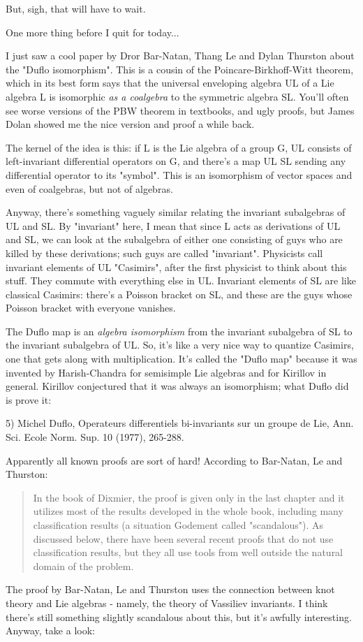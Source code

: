 But, sigh, that will have to wait.

One more thing before I quit for today...

I just saw a cool paper by Dror Bar-Natan, Thang Le and Dylan Thurston
about the "Duflo isomorphism".  This is a cousin of the 
Poincare-Birkhoff-Witt 
theorem, which in its best form says that the universal enveloping 
algebra UL of a Lie algebra L is isomorphic \emph{as a coalgebra} to the 
symmetric algebra SL.  You'll often see worse versions of the PBW theorem 
in textbooks, and ugly proofs, but James Dolan showed me the nice version 
and proof a while back.

The kernel of the idea is this: if L is the Lie algebra of a group G, 
UL consists of left-invariant differential operators on G, and there's 
a map UL \to  SL sending any differential operator to its "symbol".  
This is an isomorphism of vector spaces and even of coalgebras, but
not of algebras.  

Anyway, there's something vaguely similar relating the invariant 
subalgebras of UL and SL.  By "invariant" here, I mean that since 
L acts as derivations of UL and SL, we can look at the subalgebra of
either one consisting of guys who are killed by these derivations; 
such guys are called "invariant".   Physicists call invariant 
elements of UL "Casimirs", after the first physicist to think 
about this stuff.  They commute with everything else in 
UL.  Invariant elements of 
SL are like classical Casimirs: there's a Poisson bracket on SL, and
these are the guys whose Poisson bracket with everyone vanishes.

The Duflo map is an \emph{algebra isomorphism} from the invariant
subalgebra of SL to the invariant subalgebra of 
UL.  So, it's
like a very nice way to quantize Casimirs, one that gets along with
multiplication.  It's called the "Duflo map" because it was 
invented by
Harish-Chandra for semisimple Lie algebras and for Kirillov in general.
Kirillov conjectured that it was always an isomorphism; what Duflo
did is prove it: 

5) Michel Duflo, Operateurs differentiels bi-invariants sur un groupe
de Lie, Ann. Sci. Ecole Norm. Sup. 10 (1977), 265-288.

Apparently all known proofs are sort of hard!  According to Bar-Natan,
Le and Thurston:

\begin{quote}
   In the book of Dixmier, the proof is given only in the last chapter
   and it utilizes most of the results developed in the whole book, 
   including many classification results (a situation Godement called
   "scandalous").  As discussed below, there have been several recent
   proofs that do not use classification results, but they all use tools
   from well outside the natural domain of the problem.
\end{quote}
The proof by Bar-Natan, Le and Thurston uses the connection between
knot theory and Lie algebras - namely, the theory of Vassiliev
invariants.  I think there's still something slightly scandalous about 
this, but it's awfully interesting.  Anyway, take a look:

